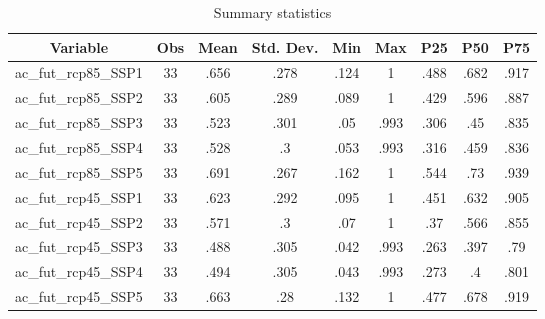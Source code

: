 \begin{table}[htbp]\centering \caption{Summary statistics\label{sumstat}}
\begin{tabular}{l c c c c c c c c}\hline\hline
\multicolumn{1}{c}{Variable} & Obs & Mean & Std. Dev.
 & Min & Max & P25 & P50 & P75  \\ \hline
ac\_fut\_rcp85\_SSP1 & 33 & .656 & .278 & .124 & 1 & .488 & .682 & .917 \\
ac\_fut\_rcp85\_SSP2 & 33 & .605 & .289 & .089 & 1 & .429 & .596 & .887 \\
ac\_fut\_rcp85\_SSP3 & 33 & .523 & .301 & .05 & .993 & .306 & .45 & .835 \\
ac\_fut\_rcp85\_SSP4 & 33 & .528 & .3 & .053 & .993 & .316 & .459 & .836 \\
ac\_fut\_rcp85\_SSP5 & 33 & .691 & .267 & .162 & 1 & .544 & .73 & .939 \\
ac\_fut\_rcp45\_SSP1 & 33 & .623 & .292 & .095 & 1 & .451 & .632 & .905 \\
ac\_fut\_rcp45\_SSP2 & 33 & .571 & .3 & .07 & 1 & .37 & .566 & .855 \\
ac\_fut\_rcp45\_SSP3 & 33 & .488 & .305 & .042 & .993 & .263 & .397 & .79 \\
ac\_fut\_rcp45\_SSP4 & 33 & .494 & .305 & .043 & .993 & .273 & .4 & .801 \\
ac\_fut\_rcp45\_SSP5 & 33 & .663 & .28 & .132 & 1 & .477 & .678 & .919 \\
\hline\end{tabular}
\end{table}
